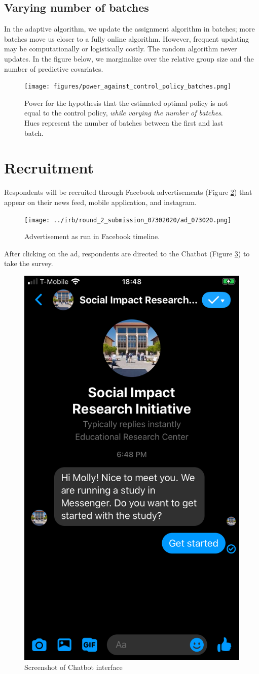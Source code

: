 \documentclass[letterpaper, 12pt, parskip=full,]{scrartcl}
\begin{document}
\subsection{Varying number of batches}
In the adaptive algorithm, we update the assignment algorithm in batches; more batches move us closer to a fully online algorithm. However, frequent updating may be computationally or logistically costly. The random algorithm never updates. In the figure below, we marginalize over the relative group size and the number of predictive covariates. 

\begin{figure}[H]
\centering
\texttt{[image: figures/power\_against\_control\_policy\_batches.png]}
\caption{Power for the hypothesis that the estimated optimal policy is not equal to the control policy, \textit{while varying the number of batches}. Hues represent the number of batches between the first and last batch.}
\label{fig:power_control_batches}
\end{figure}


\clearpage


\clearpage
\appendix

\section{Recruitment}\label{appendix:recruitment}
Respondents will be recruited through Facebook advertisements (Figure \ref{fig:ad}) that appear on their news feed, mobile application, and instagram. 

\begin{figure}[htb]
\centering
\caption{Advertisement as run in Facebook timeline.}
\label{fig:ad}
\texttt{[image: ../irb/round\_2\_submission\_07302020/ad\_073020.png]}
\end{figure}

After clicking on the ad, respondents are directed to the Chatbot (Figure \ref{fig:chatbot}) to take the survey.

\begin{figure}[htb]
\centering
\caption{Screenshot of Chatbot interface}
\label{fig:chatbot}
\includegraphics[width=.25\textwidth]{figures/chatbot_image.png}
\end{figure}
\end{document}

